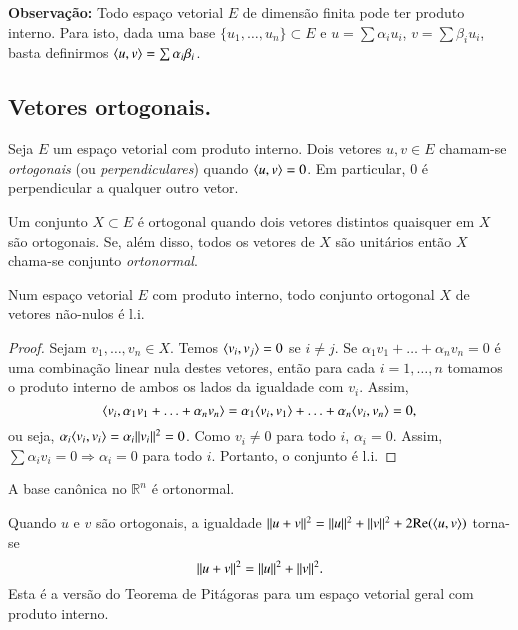 {\bf{Observação:}} Todo espaço vetorial $E$ de dimensão finita pode ter produto interno. Para isto, dada uma base $\{ u_1,\ldots,u_n\} \subset E$ e $u=\sum \alpha_i u_i$, $v=\sum \beta_i u_i$, basta definirmos $\langle u, v \rangle = \sum \alpha_i \beta_i$. 

\subsection{Vetores ortogonais.}

Seja $E$ um espaço vetorial com produto interno. Dois vetores $u,v\in E$ chamam-se \emph{ortogonais} (ou \emph{perpendiculares}) quando $\langle u, v \rangle=0$. Em particular, $0$ é perpendicular a qualquer outro vetor. 

Um conjunto $X\subset E$ é ortogonal quando dois vetores distintos quaisquer em $X$ são ortogonais. Se, além disso, todos os vetores de $X$ são unitários então $X$ chama-se conjunto \emph{ortonormal}. 

\begin{teo}
  Num espaço vetorial $E$ com produto interno, todo conjunto ortogonal $X$ de vetores não-nulos é l.i.
\end{teo}

\begin{proof}
Sejam $v_1,\ldots,v_n \in X$. Temos $\langle v_i, v_j \rangle=0$ se $i\ne j$. Se $\alpha_1v_1+\ldots+\alpha_nv_n=0$ é uma combinação linear nula destes vetores, então para cada $i=1,\ldots,n$ tomamos o produto interno de ambos os lados da igualdade com $v_i$. Assim,
\begin{equation*}
  \langle v_i, \alpha_1v_1+\ldots+\alpha_nv_n \rangle = \alpha_1\langle v_i, v_1 \rangle + \ldots + \alpha_n\langle v_i, v_n \rangle=0,
\end{equation*}
ou seja, $\alpha_i\langle v_i, v_i \rangle=\alpha_i \| v_i \|^2=0$. Como $v_i\ne 0$ para todo $i$, $\alpha_i=0$. Assim, $\sum \alpha_i v_i =0 \Rightarrow \alpha_i=0$ para todo $i$. Portanto, o conjunto é l.i.
\end{proof}

\begin{exemplo}
  A base canônica no ${\mathbb{R}}^n$ é ortonormal.
\end{exemplo}

Quando $u$ e $v$ são ortogonais, a igualdade $\| u+v \|^2=\| u \|^2+\| v \|^2+2{\text{Re}}(\langle u, v \rangle)$ torna-se 
\begin{equation*}
  \| u+v \|^2=\| u \|^2+\| v \|^2.
\end{equation*}
Esta é a versão do Teorema de Pitágoras para um espaço vetorial geral com produto interno.


